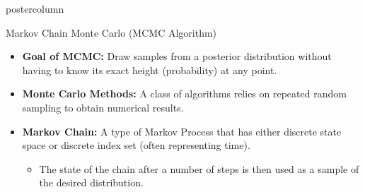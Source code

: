 \documentclass[final]{beamer}\usepackage[]{graphicx}\usepackage[]{color}
\newcommand{\red}{\textcolor{red}}
\begin{document}
{\begin{frame}
\begin{columns}
\begin{column}{.33\textwidth}
\begin{beamercolorbox}[center,wd=\textwidth]{postercolumn}
\begin{minipage}[T]{.97\textwidth}
{%
\begin{block}{Markov Chain Monte Carlo (MCMC Algorithm)}


	\begin{itemize}
			\item \textbf{Goal of MCMC:} Draw samples from a posterior distribution without having to know its exact height (probability) at any point.
			\vspace{0.3cm}
		\item \textbf{Monte Carlo Methods:} A class of algorithms relies on repeated random sampling to obtain numerical results.
		\vspace{0.3cm}
 		\item \textbf{Markov Chain:} A type of Markov Process that has either discrete state space or discrete index set (often representing time).

			\begin{itemize}
	  	\item	The state of the chain after a number of steps is then used as a sample of the desired distribution. 
		  \end{itemize}
		  \vspace{0.2cm}
		  
	 
	  
		  
		

\end{itemize}
\end{block}}
\end{minipage}
\end{beamercolorbox}
\end{column}
\end{columns}
\end{frame}}
\end{document}
